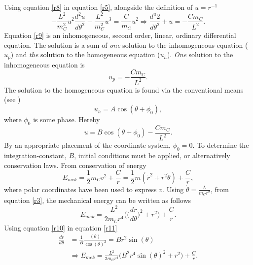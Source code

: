 \begin{example}
\begin{enumerate}
		Using equation \eqref{r8} in equation \eqref{r5}, alongside the definition of $u=r^{-1}$
		\begin{equation}
			-\frac{L^2}{m_C^2}u^2\frac{d^2u}{d\theta^2}-\frac{L^2}{m_C^2}u^3=\frac{C}{m_C}u^2\Rightarrow \frac{d^u2}{d\theta^2}+u=-\frac{Cm_C}{L^2}.
			\label{r9}
		\end{equation} 
		Equation \eqref{r9} is an inhomogeneous, second order, linear, ordinary differential equation. The solution is a sum of \emph{one} solution to the inhomogeneous equation ($u_p$) and \emph{the} solution to the homogeneous equation ($u_h$). \emph{One} solution to the inhomogeneous equation is
		\begin{equation}
			u_p=-\frac{Cm_C}{L^2}.
		\end{equation} 
		The solution to the homogeneous equation is found via the conventional means (see \citealt{calculus})
		\begin{equation}
			u_h=A\cos(\theta+\phi_0),
		\end{equation} 
		where $\phi_0$ is some phase. Hereby	
		\begin{equation}
			u=B\cos(\theta+\phi_0)-\frac{Cm_C}{L^2}.
			\label{r10}
		\end{equation} 
		By an appropriate placement of the coordinate system, $\phi_0=0$. To determine the integration-constant, $B$, initial conditions must be applied, or alternatively conservation laws. From conservation of energy
		\begin{equation}
			E_{mek}=\frac{1}{2}m_Cv^2+\frac{C}{r}=\frac{1}{2}m(\dot{r}^2+r^2\dot{\theta})+\frac{C}{r},
		\end{equation} 
		where polar coordinates have been used to express $v$. Using $\dot{\theta}=\frac{L}{m_Cr^2}$, from equation \eqref{r3}, the mechanical energy can be written as follows
		\begin{equation}
			E_{mek}=\frac{L^2}{2m_Cr^4}\bigg(\bigg(\frac{dr}{d\theta}\bigg)^2+r^2\bigg)+\frac{C}{r}.
			\label{r11}
		\end{equation} 
		Using equation \eqref{r10} in equation \eqref{r11}
		\begin{equation}
			\begin{split}
				\frac{dr}{d\theta}&=\frac{1}{B}\frac{(\theta)}{\cos(\theta)^2}=Br^2\sin(\theta)\\
				&\Rightarrow E_{mek}=\frac{L^2}{2m_Cr^4}\bigg(B^2r^4\sin(\theta)^2+r^2\bigg)+\frac{C}{r}.\\
			\end{split}
			\label{r12}
		\end{equation} 		

\end{enumerate}
\end{example}
